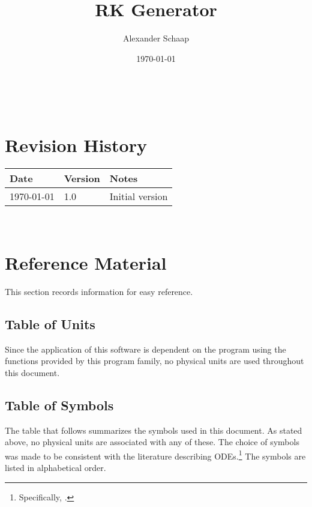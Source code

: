 \documentclass[12pt]{article}
\begin{document}
\title{RK Generator} 
\author{Alexander Schaap}
\date{\today}

\maketitle

~\newpage


\section{Revision History}

\begin{tabularx}{\textwidth}{p{3cm}p{2cm}X}
\toprule {\bf Date} & {\bf Version} & {\bf Notes}\\
\midrule
\today & 1.0 & Initial version\\
\bottomrule
\end{tabularx}

~\newpage
	
\section{Reference Material}

This section records information for easy reference.

\subsection{Table of Units}

Since the application of this software is dependent on the program using the 
functions provided by this program family, no physical units are used 
throughout this document.

\subsection{Table of Symbols}

The table that follows summarizes the symbols used in this document. As stated 
above, no physical units are associated with any of these.  The choice of 
symbols was made to be consistent with the 
literature describing ODEs.\footnote{Specifically, 
\cite{corless_graduate_2013}.}  The symbols are listed in alphabetical order.
\end{document}
